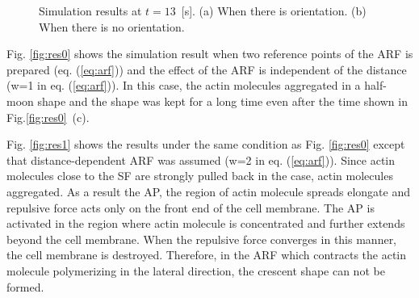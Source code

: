 \documentclass[a4paper,12pt, oneside]{book}
\begin{document}
\begin{figure}[tbp]
 \caption{Simulation results at $t=13$~[s]. (a) When there is orientation. (b) When there is no orientation.}
 \label{fig:res5}
\end{figure}
Fig. \ref{fig:res0} shows the simulation result when two reference points of the ARF is prepared (eq. (\ref{eq:arf})) and the effect of the ARF is independent of the distance (w=1 in eq. (\ref{eq:arf})).
In this case, the actin molecules aggregated in a half-moon shape and the shape was kept for a long time even after the time shown in Fig.\ref{fig:res0}~(c).

Fig. \ref{fig:res1} shows the results under the same condition as Fig. \ref{fig:res0} except that distance-dependent ARF was assumed (w=2 in eq. (\ref{eq:arf})).
Since actin molecules close to the SF are strongly pulled back in the case, actin molecules aggregated.
As a result the AP, the region of actin molecule spreads elongate and repulsive force acts only on the front end of the cell membrane.
The AP is activated in the region where actin molecule is concentrated and further extends beyond the cell membrane.
When the repulsive force converges in this manner, the cell membrane is destroyed.
Therefore, in the ARF which contracts the actin molecule polymerizing in the lateral direction, the crescent shape can not be formed.
\end{document}
